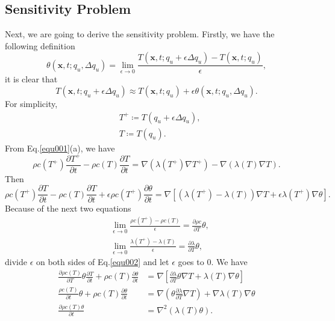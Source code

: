 \documentclass[UTF-8]{article}
\begin{document}
\subsection{Sensitivity Problem}
Next, we are going to derive the sensitivity problem. Firstly, we have the following definition
\begin{equation}
	\theta(\pmb{x},t;q_u,\Delta q_u) = \lim_{\epsilon \to 0} \frac{T(\pmb{x},t;q_u + \epsilon \Delta q_u) - T(\pmb{x},t;q_u)}{\epsilon},
\end{equation}
it is clear that
\begin{equation}\label{equ018}
	T(\pmb{x},t;q_u + \epsilon \Delta q_u) \approx T(\pmb{x},t;q_u) + \epsilon \theta(\pmb{x},t;q_u, \Delta q_u).
\end{equation}
For simplicity,
\begin{align*}
	&T^+ \coloneqq T(q_u + \epsilon \Delta q_u),\\
	&T \coloneqq T(q_u).
\end{align*}
From Eq.\ref{equ001}(a), we have
\begin{equation*}
	\rho c(T^+) \frac{\partial T^+}{\partial t} - \rho c(T) \frac{\partial T}{\partial t} = \nabla \left( \lambda(T^+) \nabla T^+ \right) - \nabla \left( \lambda(T) \nabla T \right).
\end{equation*}
Then
\begin{equation}\label{equ002}
	\rho c(T^+) \frac{\partial T}{\partial t} - \rho c(T) \frac{\partial T}{\partial t} + \epsilon \rho c(T^+) \frac{\partial \theta}{\partial t} = \nabla \left[ \left( \lambda (T^+) - \lambda(T) \right) \nabla T + \epsilon \lambda(T^+) \nabla \theta \right].
\end{equation}
Because of the next two equations
\begin{align}
	&\lim_{\epsilon \to 0} \frac{\rho c(T^+)-\rho c(T)}{\epsilon} = \frac{\partial \rho c}{\partial T} \theta, \\
	&\lim_{\epsilon \to 0} \frac{\lambda(T^+) - \lambda(T)}{\epsilon} = \frac{\partial \lambda}{\partial T} \theta,
\end{align}
divide $\epsilon$ on both sides of Eq.\ref{equ002} and let $\epsilon$ goes to $0$. We have
\begin{align}\label{equ003}
	\frac{\partial \rho c(T)}{\partial T} \theta \frac{\partial T}{\partial t} + \rho c(T) \frac{\partial \theta}{\partial t} &= \nabla \left[ \frac{\partial \lambda}{\partial T} \theta \nabla T + \lambda(T) \nabla \theta \right] \nonumber \\
	\frac{\rho c(T)}{\partial t} \theta + \rho c(T) \frac{\partial \theta}{\partial t} &= \nabla \left( \theta \frac{\partial \lambda}{\partial T} \nabla T \right) + \nabla \lambda(T) \nabla \theta \nonumber \\
	\frac{\partial \rho c(T) \theta}{\partial t} &= \nabla^2 \left( \lambda(T) \theta \right).
\end{align}
\end{document}
